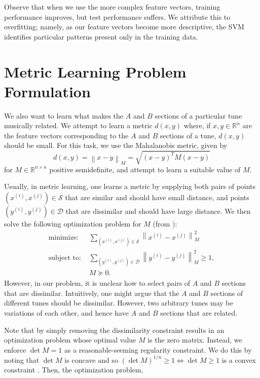 \documentclass{article} %
\newcommand{\xip}{x^{(i)}}
\newcommand{\xjp}{x^{(j)}}
\newcommand{\yip}{y^{(i)}}
\newcommand{\yjp}{y^{(j)}}
\newcommand{\vectornorm}[1]{\left\| #1 \right\|}
\begin{document}
Observe that when we use the more complex feature vectors, training performance
improves, but test performance suffers. We attribute this to overfitting;
namely, as our feature vectors become more descriptive, the SVM identifies
particular patterns present only in the training data.

\section{Metric Learning Problem Formulation}
We also want to learn what makes the $A$ and $B$ sections of a particular tune
musically related. We attempt to learn a metric $d(x, y)$ where, if $x, y \in
\mathbb{R}^n$ are the feature vectors corresponding to the $A$ and $B$ sections
of a tune, $d(x, y)$ should be small. For this task, we use the Mahalanobis
metric, given by
\[
d(x,y) = \vectornorm{x-y}_M = \sqrt{(x-y)^T M (x-y)}
\] 
for $M \in \mathbb{R}^{n\times n}$ positive semidefinite, and attempt to learn a
suitable value of $M$.

Usually, in metric learning, one learns a metric by supplying both pairs of
points $(\xip, \xjp) \in \mathcal{S}$ that are similar and should have small
distance, and points $(\yip, \yjp) \in \mathcal{D}$ that are dissimilar and
should have large distance. We then solve the following optimization problem for
$M$ (from \cite{metricNg}):
\begin{align*} 
\text{minimize: } &
\sum_{(x^{(i)}, x^{(j)}) \in \mathcal S} \vectornorm{x^{(i)} - x^{(j)}}_M^2 \\
\text{subject to: }
& \sum_{(y^{(i)}, y^{(j)}) \in \mathcal D}
	\vectornorm{y^{(i)} - y^{(j)}}_M^2 \ge 1, \\
& M \succeq 0.
\end{align*} 
However, in our problem, it is unclear how to select pairs of $A$ and $B$
sections that are dissimilar. Intuitively, one might argue that the $A$ and $B$
sections of different tunes should be dissimilar. However, two arbitrary tunes
may be variations of each other, and hence have $A$ and $B$ sections that are
related.

Note that by simply removing the dissimilarity constraint results in an
optimization problem whose optimal value $M$ is the zero matrix. Instead, we
enforce $\det M = 1$ as a reasonable-seeming regularity constraint. We do this
by noting that $\det M$ is concave and so 
$(\det M)^{1/n} \ge 1 \Leftrightarrow \det M \geq 1$ is a
convex constraint \cite{boyd}. Then, the optimization problem,
\end{document}
